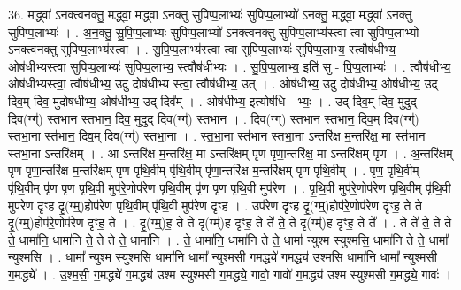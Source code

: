 \documentclass[17pt]{extarticle}
\begin{document}
36. मद्ध्वा॑ ऽनक्त्वनक्तु॒ मद्ध्वा॒ मद्ध्वा॑ ऽनक्तु सुपिप्प॒लाभ्यः॑ सुपिप्प॒लाभ्यो॑ ऽनक्तु॒ मद्ध्वा॒ मद्ध्वा॑ ऽनक्तु सुपिप्प॒लाभ्यः॑ । . अ॒न॒क्तु॒ सु॒पि॒प्प॒लाभ्यः॑ सुपिप्प॒लाभ्यो॑ ऽनक्त्वनक्तु सुपिप्प॒लाभ्य॑स्त्वा त्वा सुपिप्प॒लाभ्यो॑ ऽनक्त्वनक्तु सुपिप्प॒लाभ्य॑स्त्वा । . सु॒पि॒प्प॒लाभ्य॑स्त्वा त्वा सुपिप्प॒लाभ्यः॑ सुपिप्प॒लाभ्य॒ स्त्वौष॑धीभ्य॒ ओष॑धीभ्यस्त्वा सुपिप्प॒लाभ्यः॑ सुपिप्प॒लाभ्य॒ स्त्वौष॑धीभ्यः । . सु॒पि॒प्प॒लाभ्य॒ इति॑ सु - पि॒प्प॒लाभ्यः॑ । . त्वौष॑धीभ्य॒ ओष॑धीभ्यस्त्वा॒ त्वौष॑धीभ्य॒ उदु दोष॑धीभ्य स्त्वा॒ त्वौष॑धीभ्य॒ उत् । . ओष॑धीभ्य॒ उदु दोष॑धीभ्य॒ ओष॑धीभ्य॒ उद् दिव॒म् दिव॒ मुदोष॑धीभ्य॒ ओष॑धीभ्य॒ उद् दिव᳚म् । . ओष॑धीभ्य॒ इत्योष॑धि - भ्यः॒ । . उद् दिव॒म् दिव॒ मुदुद् दिव(ग्ग्॑) स्तभान स्तभान॒ दिव॒ मुदुद् दिव(ग्ग्॑) स्तभान । . दिव(ग्ग्॑) स्तभान स्तभान॒ दिव॒म् दिव(ग्ग्॑) स्तभा॒ना स्त॑भान॒ दिव॒म् दिव(ग्ग्॑) स्तभा॒ना । . स्त॒भा॒ना स्त॑भान स्तभा॒ना ऽन्तरि॑क्ष म॒न्तरि॑क्ष॒ मा स्त॑भान स्तभा॒ना ऽन्तरि॑क्षम् । . आ ऽन्तरि॑क्ष म॒न्तरि॑क्ष॒ मा ऽन्तरि॑क्षम् पृण पृणा॒न्तरि॑क्ष॒ मा ऽन्तरि॑क्षम् पृण । . अ॒न्तरि॑क्षम् पृण पृणा॒न्तरि॑क्ष म॒न्तरि॑क्षम् पृण पृथि॒वीम् पृ॑थि॒वीम् पृ॑णा॒न्तरि॑क्ष म॒न्तरि॑क्षम् पृण पृथि॒वीम् । . पृ॒ण॒ पृ॒थि॒वीम् पृ॑थि॒वीम् पृ॑ण पृण पृथि॒वी मुप॑रे॒णोप॑रेण पृथि॒वीम् पृ॑ण पृण पृथि॒वी मुप॑रेण । . पृ॒थि॒वी मुप॑रे॒णोप॑रेण पृथि॒वीम् पृ॑थि॒वी मुप॑रेण दृꣳह दृ॒(ग्म्॒)होप॑रेण पृथि॒वीम् पृ॑थि॒वी मुप॑रेण दृꣳह । . उप॑रेण दृꣳह दृ॒(ग्म्॒)होप॑रे॒णोप॑रेण दृꣳह॒ ते ते दृ॒(ग्म्॒)होप॑रे॒णोप॑रेण दृꣳह॒ ते । . दृ॒(ग्म्॒)ह॒ ते ते दृ(ग्म्॑)ह दृꣳह॒ ते ते॑ ते॒ ते दृ(ग्म्॑)ह दृꣳह॒ ते ते᳚ । . ते ते॑ ते॒ ते ते ते॒ धामा॑नि॒ धामा॑नि ते॒ ते ते ते॒ धामा॑नि । . ते॒ धामा॑नि॒ धामा॑नि ते ते॒ धामा᳚ न्युश्म स्युश्मसि॒ धामा॑नि ते ते॒ धामा᳚ न्युश्मसि । . धामा᳚ न्युश्म स्युश्मसि॒ धामा॑नि॒ धामा᳚ न्युश्मसी ग॒मद्ध्ये॑ ग॒मद्ध्य॑ उश्मसि॒ धामा॑नि॒ धामा᳚ 
न्युश्मसी ग॒मद्ध्ये᳚ । . उ॒श्म॒सी॒ ग॒मद्ध्ये॑ ग॒मद्ध्य॑ उश्म स्युश्मसी ग॒मद्ध्ये॒ गावो॒ गावो॑ ग॒मद्ध्य॑ उश्म स्युश्मसी ग॒मद्ध्ये॒ गावः॑ । \newline
\pagebreak
{}
\end{document}
